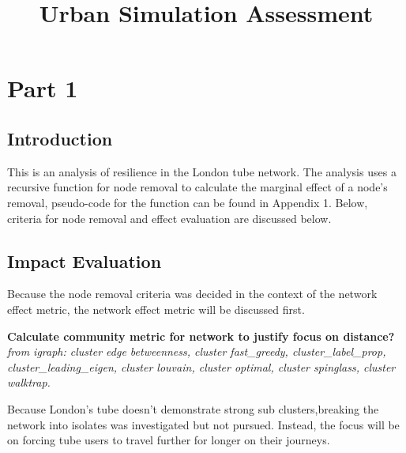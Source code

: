 \documentclass[11pt]{article} %
\title{\vspace{-3.0cm}Urban Simulation Assessment}
\begin{document}
\maketitle


\section{Part 1}



\subsection{Introduction}

This is an analysis of resilience in the London tube network. The analysis uses a recursive function for node removal to calculate the marginal effect of a node's removal, pseudo-code for the function can be found in Appendix 1. Below, criteria for node removal and effect evaluation are discussed below. 


\subsection{Impact Evaluation}

Because the node removal criteria was decided in the context of the network effect metric, the network effect metric will be discussed first. 

\textbf{Calculate community metric for network to justify focus on distance?}
\textit{from igraph: cluster edge betweenness, cluster fast\_greedy, cluster\_label\_prop, cluster\_leading\_eigen, cluster louvain, cluster optimal, cluster spinglass, cluster walktrap.}

Because London's tube doesn't demonstrate strong sub clusters,breaking the network into isolates was investigated but not pursued. Instead, the focus will be on forcing tube users to travel further for longer on their journeys. 
\end{document}
